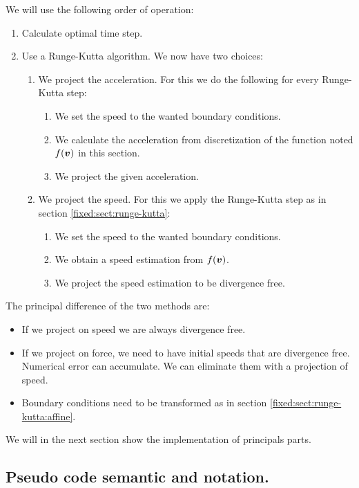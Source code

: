We will use the following order of operation:
\begin{enumerate}
\item Calculate optimal time step.
 \item Use a Runge-Kutta algorithm. We now have two choices:
 \begin{enumerate}
  \item We project the acceleration.
	For this we do the following for every Runge-Kutta step:
	\begin{enumerate}
	\item We set the speed to the wanted boundary conditions.
	 \item We calculate the acceleration from discretization of the function noted $f({\boldsymbol {v}})$ in this section.
	 \item We project the given acceleration.
	\end{enumerate}
 \item We project the speed.
 For this we apply the Runge-Kutta step as in section \ref{fixed:sect:runge-kutta}:
	\begin{enumerate}
	\item We set the speed to the wanted boundary conditions.
	\item We obtain a speed estimation from $f({\boldsymbol {v}})$.
	\item We project the speed estimation to be divergence free.
	\end{enumerate}
 \end{enumerate}

\end{enumerate}

The principal difference of the two methods are:
\begin{itemize}
 \item If we project on speed we are always divergence free.
 \item If we project on force, we need to have initial speeds that are divergence free. Numerical error can accumulate.
 We can eliminate them with a projection of speed.
 \item Boundary conditions need to be transformed as in section \ref{fixed:sect:runge-kutta:affine}.
\end{itemize}

We will in the next section show the implementation of principals parts.

\subsection{Pseudo code semantic and notation.}

